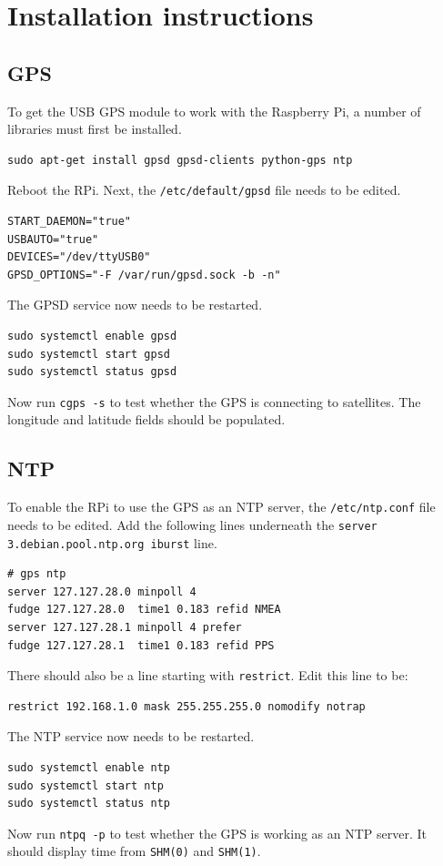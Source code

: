 \documentclass[11pt]{report}
\begin{document}
\clearpage
\newpage
{}


\pagebreak

\appendix

\chapter{Installation instructions}

\section{GPS}

To get the USB GPS module to work with the Raspberry Pi, a number of libraries must first be installed.
\begin{lstlisting}
sudo apt-get install gpsd gpsd-clients python-gps ntp
\end{lstlisting}
Reboot the RPi. Next, the \texttt{/etc/default/gpsd} file needs to be edited.
\begin{lstlisting}
START_DAEMON="true"
USBAUTO="true"
DEVICES="/dev/ttyUSB0"
GPSD_OPTIONS="-F /var/run/gpsd.sock -b -n"
\end{lstlisting}
The GPSD service now needs to be restarted.
\begin{lstlisting}
sudo systemctl enable gpsd
sudo systemctl start gpsd
sudo systemctl status gpsd
\end{lstlisting}
Now run \texttt{cgps -s} to test whether the GPS is connecting to satellites. The longitude and latitude fields should be populated.

\section{NTP}

To enable the RPi to use the GPS as an NTP server, the \texttt{/etc/ntp.conf} file needs to be edited. Add the following lines underneath the \texttt{server 3.debian.pool.ntp.org iburst} line.
\begin{lstlisting}
# gps ntp
server 127.127.28.0 minpoll 4
fudge 127.127.28.0  time1 0.183 refid NMEA
server 127.127.28.1 minpoll 4 prefer
fudge 127.127.28.1  time1 0.183 refid PPS
\end{lstlisting}
There should also be a line starting with \texttt{restrict}. Edit this line to be:
\begin{lstlisting}
restrict 192.168.1.0 mask 255.255.255.0 nomodify notrap
\end{lstlisting}
The NTP service now needs to be restarted.
\begin{lstlisting}
sudo systemctl enable ntp
sudo systemctl start ntp
sudo systemctl status ntp
\end{lstlisting}
Now run \texttt{ntpq -p} to test whether the GPS is working as an NTP server. It should display time from \texttt{SHM(0)} and \texttt{SHM(1)}.
\end{document}
